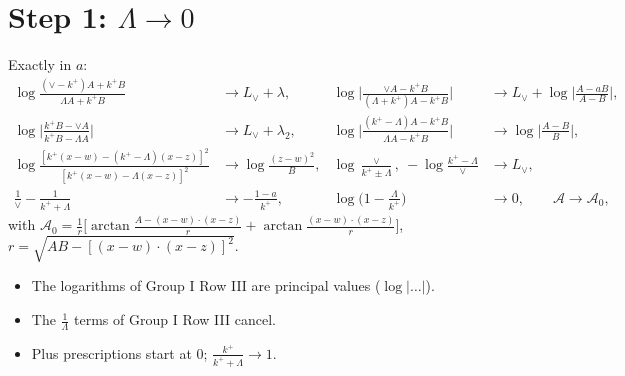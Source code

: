\documentclass[10pt]{article}
\numberwithin{equation}{section}
\newcommand{\Lv}{L_{\vee}}
\begin{document}
\section{Step 1: \texorpdfstring{$\Lambda\to0$}{Lambda -> 0}}\label{sec:lam}
Exactly in $a$:
\begin{align*}
\log\frac{(\vee-k^+)A+k^+B}{\Lambda A+k^+B}&\to\Lv+\lambda, &
\log\Big|\frac{\vee A-k^+B}{(\Lambda+k^+)A-k^+B}\Big|&\to\Lv+\log\Big|\frac{A-aB}{A-B}\Big|,\\
\log\Big|\frac{k^+B-\vee A}{k^+B-\Lambda A}\Big|&\to\Lv+\lambda_2, &
\log\Big|\frac{(k^+-\Lambda)A-k^+B}{\Lambda A-k^+B}\Big|&\to\log\Big|\frac{A-B}{B}\Big|,\\
\log\frac{[k^+(x-w)-(k^+-\Lambda)(x-z)]^2}{[k^+(x-w)-\Lambda(x-z)]^2}&\to\log\frac{(z-w)^2}{B}, &
\log\frac{\vee}{k^+\pm\Lambda},\ -\log\frac{k^+-\Lambda}{\vee}&\to\Lv,\\
\frac1\vee-\frac{1}{k^++\Lambda}&\to-\frac{1-a}{k^+}, &
\log\Big(1-\frac{\Lambda}{k^+}\Big)&\to0,\qquad\mathcal A\to\mathcal A_0,
\end{align*}
with $\mathcal A_0=\frac1r\big[\arctan\frac{A-(x-w)\cdot(x-z)}{r}+\arctan\frac{(x-w)\cdot(x-z)}{r}\big]$, $r=\sqrt{AB-[(x-w)\cdot(x-z)]^2}$.
\begin{itemize}
\item The logarithms of Group I Row III are principal values ($\log|\dots|$).
\item The $\frac1\Lambda$ terms of Group I Row III cancel.
\item Plus prescriptions start at $0$; $\frac{k^+}{k^++\Lambda}\to1$.
\end{itemize}

\end{document}

